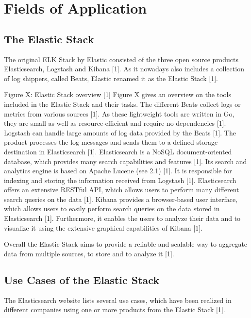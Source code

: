 \chapter{Fields of Application}

\section{The Elastic Stack}
The original ELK Stack by Elastic consisted of the three open source products Elasticsearch, Logstash and Kibana [1]. As it nowadays also includes a collection of log shippers, called Beats, Elastic renamed it as the Elastic Stack [1].
  
Figure X: Elastic Stack overview [1]
Figure X gives an overview on the tools included in the Elastic Stack and their tasks.
The different Beats collect logs or metrics from various sources [1]. As these lightweight tools are written in Go, they are small as well as resource-efficient and require no dependencies [1]. 
Logstash can handle large amounts of log data provided by the Beats [1]. The product processes the log messages and sends them to a defined storage destination in Elasticsearch [1]. 
Elasticsearch is a NoSQL document-oriented database, which provides many search capabilities and features [1]. Its search and analytics engine is based on Apache Lucene (see 2.1) [1]. It is responsible for indexing and storing the information received from Logstash [1]. Elasticsearch offers an extensive RESTful API, which allows users to perform many different search queries on the data [1]. 
Kibana provides a browser-based user interface, which allows users to easily perform search queries on the data stored in Elasticsearch [1]. Furthermore, it enables the users to analyze their data and to visualize it using the extensive graphical capabilities of Kibana [1].

Overall the Elastic Stack aims to provide a reliable and scalable way to aggregate data from multiple sources, to store and to analyze it [1].

\section{Use Cases of the Elastic Stack}
The Elasticsearch website lists several use cases, which have been realized in different companies using one or more products from the Elastic Stack [1]. 

